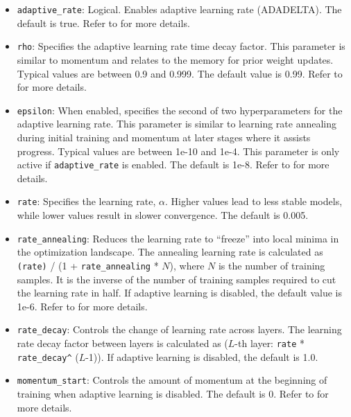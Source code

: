 {{\begin{itemize}
\item \texttt{adaptive\_rate}: Logical.  Enables adaptive learning rate (ADADELTA). The default is true. Refer to {\textbf{}} for more details.

\item \texttt{rho}: Specifies the adaptive learning rate time decay factor. This parameter is similar to momentum and relates to the memory for prior weight updates. Typical values are between 0.9 and 0.999. The default value is 0.99. %
Refer to {\textbf{}} for more details. 

\item \texttt{epsilon}: When enabled, specifies the second of two hyperparameters for the adaptive learning rate. This parameter is similar to learning rate annealing during initial training and momentum at later stages where it assists progress. Typical values are between 1e-10 and 1e-4. This parameter is only active if \texttt{adaptive\_rate} is enabled. The default is 1e-8. %
Refer to {\textbf{}} for more details.

\item \texttt{rate}: Specifies the learning rate, $\alpha$. Higher values lead to less stable models, while lower values result in slower convergence. The default is 0.005.  %

\item \texttt{rate\_annealing}: Reduces the learning rate to ``freeze'' into local minima in the optimization landscape. The annealing learning rate is calculated as \texttt{(rate)} / (1 + \texttt{rate\_annealing} * $N$), where $N$ is the number of training samples.  It is the inverse of the number of training samples required to cut the learning rate in half.  If adaptive learning is disabled, the default value is 1e-6. Refer to {\textbf{}} for more details.

\item \texttt{rate\_decay}:  Controls the change of learning rate across layers. The learning rate decay factor between layers is calculated as ($L$-th layer: \texttt{rate} * \texttt{rate\_decay\^} ($L$-1)). If adaptive learning is disabled, the default is 1.0. 

\item \texttt{momentum\_start}: Controls the amount of momentum at the beginning of training when adaptive learning is disabled. The default is 0. Refer to {\textbf{}} for more details.


\end{itemize}}}
